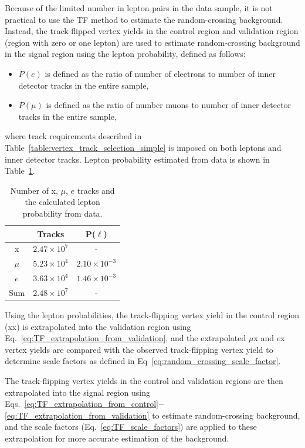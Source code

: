 Because of the limited number in lepton pairs in the data sample, it is not practical to use the TF method to estimate the random-crossing background. Instead, the track-flipped vertex yields in the control region and validation region (region with zero or one lepton) are used to estimate random-crossing background in the signal region using the lepton probability, defined as follows:
\begin{itemize}
\item $P(e)$ is defined as the ratio of number of electrons to number of inner detector tracks in the entire sample,
\item $P(\mu)$ is defined as the ratio of number muons to number of inner detector tracks in the entire sample,
\end{itemize}
where track requirements described in Table~\ref{table:vertex_track_selection_simple} is imposed on both leptons and inner detector tracks. Lepton probability estimated from data is shown in Table~\ref{table:lepton_probability}.

\begin{table}[!htb]%
  \centering
    \begin{tabular}[t]{ccc}
        \hline\hline
                & Tracks             & P($\ell$)           \\
         \hline
         x      & $2.47\times10^{7}$ & -                   \\
         $\mu$  & $5.23\times10^{4}$ & $2.10\times10^{-3}$ \\
         $e$    & $3.63\times10^{4}$ & $1.46\times10^{-3}$ \\
         Sum    & $2.48\times10^{7}$ & - \\
        \hline\hline
    \end{tabular}
  \caption{Number of x, $\mu$, $e$ tracks and the calculated lepton probability from data.}%
  \label{table:lepton_probability}
\end{table}


Using the lepton probabilities, the track-flipping vertex yield in the control region (xx) is extrapolated into the validation region using Eq.~\ref{eq:TF_extrapolation_from_validation}, and the extrapolated $\mu$x and $e$x vertex yields are compared with the observed track-flipping vertex yield to determine scale factors as defined in Eq~\ref{eq:random_crossing_scale_factor}.

The track-flipping vertex yields in the control and validation regions are then extrapolated into the signal region using Eqs.~\ref{eq:TF_extrapolation_from_control}$-$\ref{eq:TF_extrapolation_from_validation} to estimate random-crossing background, and the scale factors (Eq.~\ref{eq:TF_scale_factors}) are applied to these extrapolation for more accurate estimation of the background.



